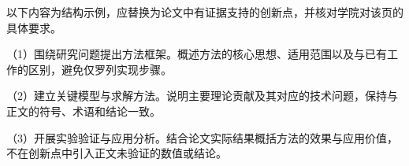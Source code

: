 \clearpage
{}
\thispagestyle{empty}
\thesisbodyfont
以下内容为结构示例，应替换为论文中有证据支持的创新点，并核对学院对该页的具体要求。

（1）围绕研究问题提出方法框架。概述方法的核心思想、适用范围以及与已有工作的区别，避免仅罗列实现步骤。

（2）建立关键模型与求解方法。说明主要理论贡献及其对应的技术问题，保持与正文的符号、术语和结论一致。

（3）开展实验验证与应用分析。结合论文实际结果概括方法的效果与应用价值，不在创新点中引入正文未验证的数值或结论。
